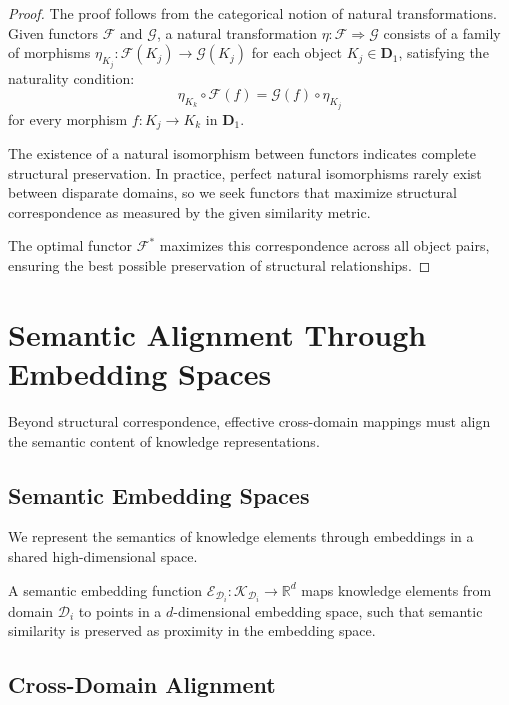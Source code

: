 \begin{proof}
The proof follows from the categorical notion of natural transformations. Given functors $\mathcal{F}$ and $\mathcal{G}$, a natural transformation $\eta: \mathcal{F} \Rightarrow \mathcal{G}$ consists of a family of morphisms $\eta_{K_j}: \mathcal{F}(K_j) \rightarrow \mathcal{G}(K_j)$ for each object $K_j \in \mathbf{D}_1$, satisfying the naturality condition:
\begin{equation}
\eta_{K_k} \circ \mathcal{F}(f) = \mathcal{G}(f) \circ \eta_{K_j}
\end{equation}
for every morphism $f: K_j \rightarrow K_k$ in $\mathbf{D}_1$.

The existence of a natural isomorphism between functors indicates complete structural preservation. In practice, perfect natural isomorphisms rarely exist between disparate domains, so we seek functors that maximize structural correspondence as measured by the given similarity metric.

The optimal functor $\mathcal{F}^*$ maximizes this correspondence across all object pairs, ensuring the best possible preservation of structural relationships.
\end{proof}

\section{Semantic Alignment Through Embedding Spaces}

Beyond structural correspondence, effective cross-domain mappings must align the semantic content of knowledge representations.

\subsection{Semantic Embedding Spaces}

We represent the semantics of knowledge elements through embeddings in a shared high-dimensional space.

\begin{definition}
A semantic embedding function $\mathcal{E}_{\mathcal{D}_i}: \mathcal{K}_{\mathcal{D}_i} \rightarrow \mathbb{R}^d$ maps knowledge elements from domain $\mathcal{D}_i$ to points in a $d$-dimensional embedding space, such that semantic similarity is preserved as proximity in the embedding space.
\end{definition}

\subsection{Cross-Domain Alignment}


